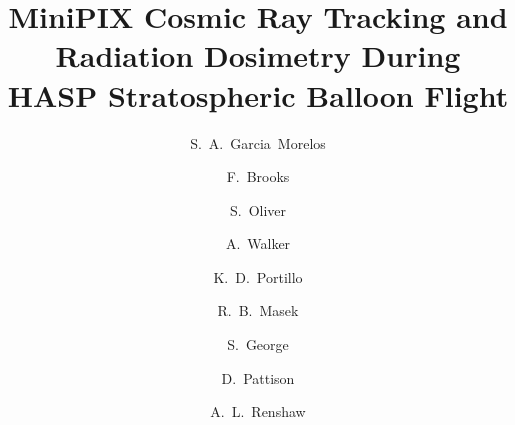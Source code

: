 \documentclass[final,1p, times, twocolumn]{elsarticle}
\begin{document}
\begin{frontmatter}


\title{MiniPIX Cosmic Ray Tracking and Radiation Dosimetry During HASP Stratospheric Balloon Flight}


\author{S.~A.~Garcia~Morelos}
\author{F.~Brooks}
\author{S.~Oliver}
\author{A.~Walker}
\author{K.~D.~Portillo}
\author{R.~B.~Masek}
\author{S.~George}
\author{D.~Pattison}
\author{A.~L.~Renshaw}




\address[label2,label3,label4,label5,label6,label7,label8,label9,label10]{Department of Physics, University of Houston, Houston, TX 77204, USA}


\end{frontmatter}
\end{document}
